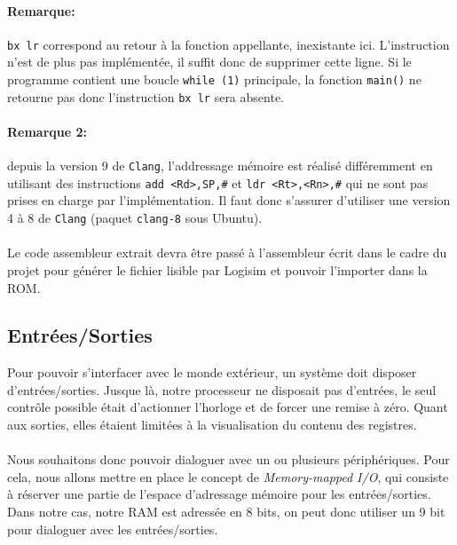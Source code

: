 \documentclass{article}
\begin{document}
    \paragraph{Remarque:} \texttt{bx lr} correspond au retour à la fonction appellante, inexistante ici.
    L'instruction n'est de plus pas implémentée, il suffit donc de supprimer cette ligne.
    Si le programme contient une boucle \texttt{while (1)} principale, la fonction \texttt{main()} ne retourne pas donc l'instruction \texttt{bx lr} sera absente.

    \paragraph{Remarque 2:} depuis la version 9 de \texttt{Clang}, l'addressage mémoire est réalisé différemment en utilisant des instructions \texttt{add <Rd>,SP,\#<imm8>} et \texttt{ldr <Rt>,<Rn>,\#<imm5>} qui ne sont pas prises en charge par l'implémentation.
    Il faut donc s'assurer d'utiliser une version 4 à 8 de \texttt{Clang} (paquet \texttt{clang-8} sous Ubuntu).

    \paragraph{}
    Le code assembleur extrait devra être passé à l'assembleur écrit dans le cadre du projet pour générer le fichier lisible par Logisim et pouvoir l'importer dans la ROM.

    \subsection{Entrées/Sorties}

    Pour pouvoir s'interfacer avec le monde extérieur, un système doit disposer d'entrées/sorties.
    Jusque là, notre processeur ne disposait pas d'entrées, le seul contrôle possible était d'actionner l'horloge et de forcer une remise à zéro.
    Quant aux sorties, elles étaient limitées à la visualisation du contenu des registres.

    \paragraph{}
    Nous souhaitons donc pouvoir dialoguer avec un ou plusieurs périphériques.
    Pour cela, nous allons mettre en place le concept de \textit{Memory-mapped I/O}, qui consiste à réserver une partie de l'espace d'adressage mémoire pour les entrées/sorties.
    Dans notre cas, notre RAM est adressée en 8 bits, on peut donc utiliser un 9\ieme {} bit pour dialoguer avec les entrées/sorties.
\end{document}
